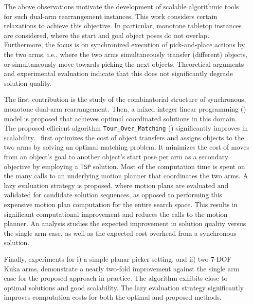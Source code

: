 The above observations motivate the development of scalable algorithmic
tools for such dual-arm rearrangement instances. This work considers
certain relaxations to achieve this objective. In particular,
monotone tabletop instances are considered, where the start and goal
object poses do not overlap.  Furthermore, the focus is on
synchronized execution of pick-and-place actions by the two arms. i.e., where the two arms simultaneously transfer (different) objects, or simultaneously move towards picking the next objects.
Theoretical arguments and experimental evaluation indicate that this does not significantly degrade solution
quality.



The first contribution is the study of the combinatorial structure of
synchronous, monotone dual-arm rearrangement. Then, a mixed integer linear programming (\milp) model is
proposed that achieves optimal coordinated solutions in this domain.
The proposed efficient algorithm {\tt Tour\_Over\_Matching} (\algo) significantly improves in scalability. \algo\ first optimizes the
cost of object transfers and assigns objects to the two arms by
solving an optimal matching problem. It minimizes the cost of
moves from an object's goal to another object's start pose per
arm as a secondary objective by employing a {\tt TSP} solution. Most
of the computation time is spent on the many calls to an underlying motion planner that coordinates the two arms. A lazy
evaluation strategy is proposed, where motion plans are evaluated and validated for candidate solution sequences, as opposed to performing this expensive motion plan computation for the entire search space. This results in significant computational improvement and
reduces the calls to the motion planner.  An analysis
studies the expected improvement in solution quality
versus the single arm case, as well as the expected cost overhead from a
synchronous solution.

Finally, experiments for i) a simple planar picker setting, and ii) two 7-DOF Kuka arms, demonstrate a nearly two-fold
improvement against the single arm case for the proposed approach in practice. The algorithm exhibits close to optimal solutions and good scalability. 
The lazy evaluation strategy significantly improves computation costs for both the optimal and proposed methods.

